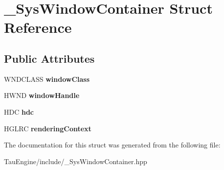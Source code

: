 \hypertarget{struct___sys_window_container}{}\section{\+\_\+\+Sys\+Window\+Container Struct Reference}
\label{struct___sys_window_container}
\subsection*{Public Attributes}
\begin{DoxyCompactItemize}
\item 
\mbox{\label{struct___sys_window_container_a629a7862258aca9876bda74abfd303fd}} 
W\+N\+D\+C\+L\+A\+SS {\bfseries window\+Class}
\item 
\mbox{\label{struct___sys_window_container_a58036c5e1f570ce332b94d2017e01d4a}} 
H\+W\+ND {\bfseries window\+Handle}
\item 
\mbox{\label{struct___sys_window_container_a236b3d0887c4e8ead7ca0d7992431ee8}} 
H\+DC {\bfseries hdc}
\item 
\mbox{\label{struct___sys_window_container_aff1236bea591d960e7bf0e6063ed8c31}} 
H\+G\+L\+RC {\bfseries rendering\+Context}
\end{DoxyCompactItemize}


The documentation for this struct was generated from the following file\+:\begin{DoxyCompactItemize}
\item 
Tau\+Engine/include/\+\_\+\+Sys\+Window\+Container.\+hpp\end{DoxyCompactItemize}

